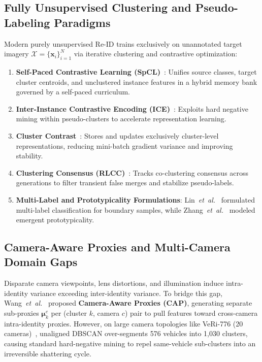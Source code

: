 \subsection{Fully Unsupervised Clustering and Pseudo-Labeling Paradigms}
\label{subsec:fully_unsupervised_reid}

Modern purely unsupervised Re-ID trains exclusively on unannotated target imagery $\mathcal{X} = \{\mathbf{x}_i\}_{i=1}^N$ via iterative clustering and contrastive optimization:
\begin{enumerate}[leftmargin=*]
    \item \textbf{Self-Paced Contrastive Learning (SpCL)}~\cite{ge2020selfpaced}: Unifies source classes, target cluster centroids, and unclustered instance features in a hybrid memory bank governed by a self-paced curriculum.
    \item \textbf{Inter-Instance Contrastive Encoding (ICE)}~\cite{chen2021ice}: Exploits hard negative mining within pseudo-clusters to accelerate representation learning.
    \item \textbf{Cluster Contrast}~\cite{dai2022cluster}: Stores and updates exclusively cluster-level representations, reducing mini-batch gradient variance and improving stability.
    \item \textbf{Clustering Consensus (RLCC)}~\cite{zhang2021rlcc}: Tracks co-clustering consensus across generations to filter transient false merges and stabilize pseudo-labels.
    \item \textbf{Multi-Label and Prototypicality Formulations}: Lin~\textit{et~al.}~\cite{lin2020unsupervised} formulated multi-label classification for boundary samples, while Zhang~\textit{et~al.}~\cite{zhang2023ise} modeled emergent prototypicality.
\end{enumerate}

\subsection{Camera-Aware Proxies and Multi-Camera Domain Gaps}
\label{subsec:camera_aware_reid}

Disparate camera viewpoints, lens distortions, and illumination induce intra-identity variance exceeding inter-identity variance. To bridge this gap, Wang~\textit{et~al.}~\cite{wang2021cap} proposed \textbf{Camera-Aware Proxies (CAP)}, generating separate sub-proxies $\boldsymbol{\mu}_k^c$ per (cluster $k$, camera $c$) pair to pull features toward cross-camera intra-identity proxies. However, on large camera topologies like VeRi-776 (20 cameras)~\cite{liu2016deepveri}, unaligned DBSCAN over-segments 576 vehicles into 1,030 clusters, causing standard hard-negative mining to repel same-vehicle sub-clusters into an irreversible shattering cycle.

